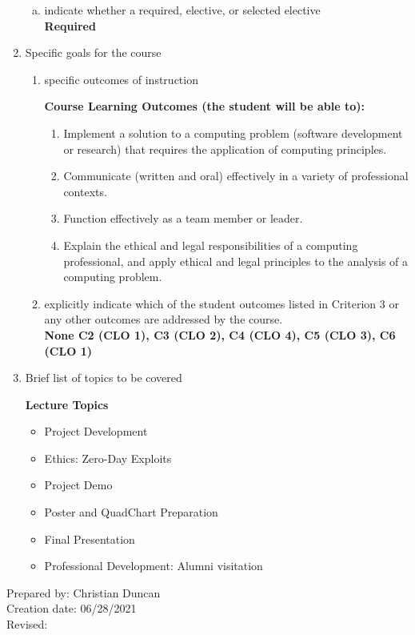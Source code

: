 \begin{enumerate}[1.]
\begin{enumerate}[a.]
\item indicate whether a required, elective, or selected elective\\ %
  {\bfseries
    Required
  }

\end{enumerate}

\item Specific goals for the course
\begin{enumerate}
\item specific outcomes of instruction\\ %
  {\bfseries
    Course Learning Outcomes (the student will be able to):
    \begin{enumerate}[1.]
    \item Implement a solution to a computing problem (software development or research) that requires the application of computing principles.
    \item Communicate (written and oral) effectively in a variety of professional contexts.
    \item Function effectively as a team member or leader.
    \item Explain the ethical and legal responsibilities of a computing professional, and apply ethical and legal principles to the analysis of a computing problem.
   \end{enumerate}
  }

\item explicitly indicate which of the student outcomes listed in Criterion 3 or any other outcomes are addressed by the course.\\
  {\bfseries
    None
    C2 (CLO 1),
    C3 (CLO 2),
    C4 (CLO 4),
    C5 (CLO 3),
    C6 (CLO 1)
  }
\end{enumerate}

\item Brief list of topics to be covered\\
  {\bfseries
    Lecture Topics
    \begin{itemize}
      \item Project Development
      \item Ethics: Zero-Day Exploits
      \item Project Demo
      \item Poster and QuadChart Preparation
      \item Final Presentation
      \item Professional Development: Alumni visitation
    \end{itemize}
  }

\end{enumerate}

\noindent Prepared by: Christian Duncan\\
\noindent Creation date: 06/28/2021\\
\noindent Revised:\\
